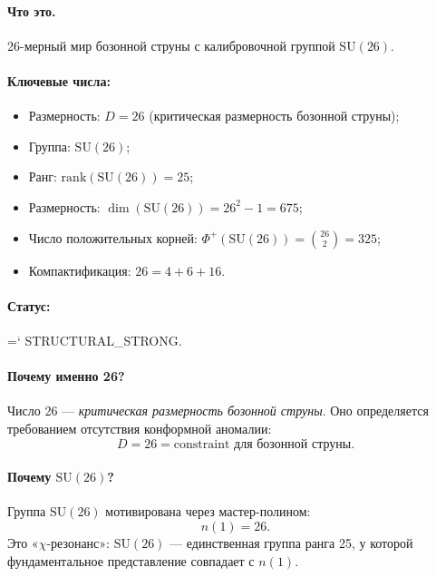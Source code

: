 \documentclass[11pt,a4paper]{article}
\newcommand{\SU}{\mathrm{SU}}
\renewcommand{\texttt}[1]{{\ttfamily\hyphenchar\font=`\- #1}}
\theoremstyle{definition}
\begin{document}
\paragraph{Что это.}
26-мерный мир бозонной струны с калибровочной группой $\SU(26)$.

\paragraph{Ключевые числа:}
\begin{itemize}
    \item Размерность: $D = 26$ (критическая размерность 
          бозонной струны);
    \item Группа: $\SU(26)$;
    \item Ранг: $\mathrm{rank}(\SU(26)) = 25$;
    \item Размерность: $\dim(\SU(26)) = 26^2 - 1 = 675$;
    \item Число положительных корней: 
          $\Phi^+(\SU(26)) = \binom{26}{2} = 325$;
    \item Компактификация: $26 = 4 + 6 + 16$.
\end{itemize}

\paragraph{Статус:} \texttt{STRUCTURAL\_STRONG}.

\paragraph{Почему именно 26?}
Число 26 — \emph{критическая размерность бозонной струны}. Оно 
определяется требованием отсутствия конформной аномалии:
\begin{equation}
    D = 26 = \text{constraint для бозонной струны}.
\end{equation}

\paragraph{Почему $\SU(26)$?}
Группа $\SU(26)$ мотивирована через мастер-полином:
\begin{equation}
    n(1) = 26.
\end{equation}
Это «$\chi$-резонанс»: $\SU(26)$ — единственная группа ранга 25, 
у которой фундаментальное представление совпадает с $n(1)$.

\end{document}
